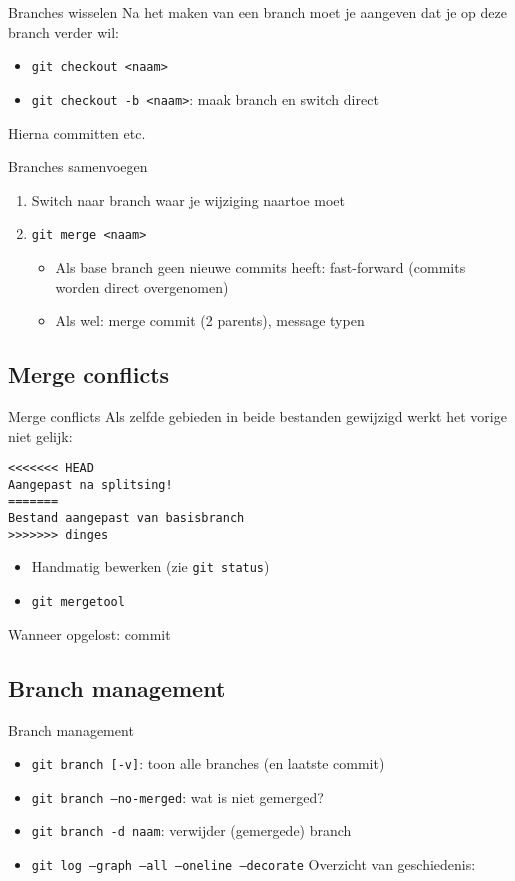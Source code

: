 \begin{frame}{Branches wisselen}
	Na het maken van een branch moet je aangeven dat je op deze branch verder wil:
	\begin{itemize}
		\item \texttt{git checkout <naam>}
		\item \texttt{git checkout -b <naam>}: maak branch en switch direct
	\end{itemize}
	Hierna committen etc.
\end{frame}

\begin{frame}{Branches samenvoegen}
	\begin{enumerate}
		\item Switch naar branch waar je wijziging naartoe moet
		\item \texttt{git merge <naam>}
			\begin{itemize}
				\item Als base branch geen nieuwe commits heeft: fast-forward (commits worden direct overgenomen)
				\item Als wel: merge commit (2 parents), message typen
			\end{itemize}
	\end{enumerate}
\end{frame}

\subsection{Merge conflicts}
\begin{frame}[fragile]{Merge conflicts}
	Als zelfde gebieden in beide bestanden gewijzigd werkt het vorige niet gelijk:
	\begin{verbatim}
<<<<<<< HEAD
Aangepast na splitsing!
=======
Bestand aangepast van basisbranch
>>>>>>> dinges
	\end{verbatim}
	\begin{itemize}
		\item Handmatig bewerken (zie \texttt{git status})
		\item \texttt{git mergetool}
	\end{itemize}
	Wanneer opgelost: commit
\end{frame}

\subsection{Branch management}
\begin{frame}{Branch management}
	\begin{itemize}
		\item \texttt{git branch [-v]}: toon alle branches (en laatste commit)
		\item \texttt{git branch --no-merged}: wat is niet gemerged?
		\item \texttt{git branch -d naam}: verwijder (gemergede) branch
		\item \texttt{git log --graph --all --oneline --decorate} Overzicht van geschiedenis:
	\end{itemize}
\end{frame}

